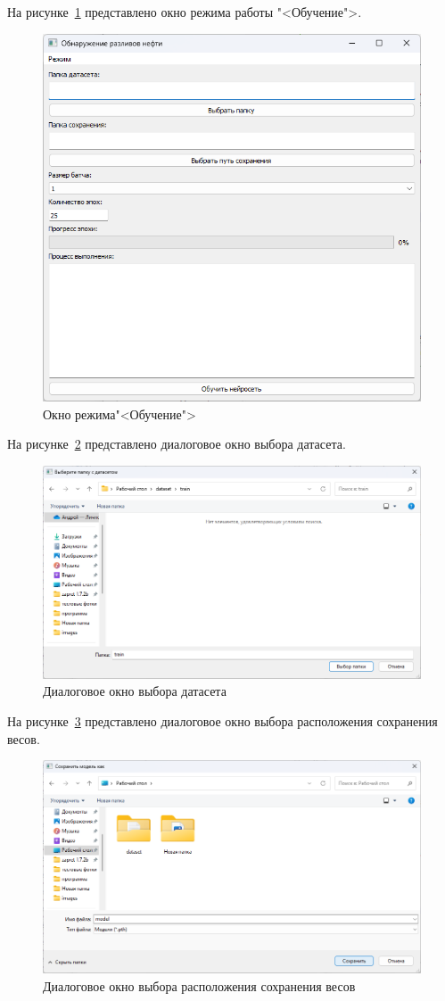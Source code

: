 На рисунке~\ref{fig:train_ui} представлено окно режима работы "<Обучение">.
\begin{figure}[H]
	\centering
	\includegraphics[width=0.7\linewidth]{"images/обучение главное окно"}
	\caption{Окно режима"<Обучение">}
	\label{fig:train_ui}
\end{figure}

На рисунке~\ref{fig:dataset_select} представлено диалоговое окно выбора датасета.
\begin{figure}[H]
	\centering
	\includegraphics[width=0.7\linewidth]{"images/выбор датасета"}
	\caption{Диалоговое окно выбора датасета}
	\label{fig:dataset_select}
\end{figure}

На рисунке~\ref{fig:weights_save} представлено диалоговое окно выбора расположения сохранения весов.
\begin{figure}[H]
	\centering
	\includegraphics[width=0.7\linewidth]{"images/сохранение весов"}
	\caption{Диалоговое окно выбора расположения сохранения весов}
	\label{fig:weights_save}
\end{figure}

